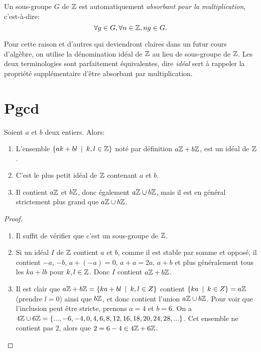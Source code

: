 \begin{proposition} Un sous-groupe $G$ de $\mathbb{Z}$ est automatiquement \emph{absorbant pour la multiplication}, c'est-à-dire:
\[ \forall g\in G, \forall n\in \mathbb{Z}, ng \in G.\]
\end{proposition}

Pour cette raison et d'autres qui deviendront claires dans un futur cours d'algèbre, on utilise la dénomination \og idéal de $\mathbb{Z}$\fg{} au lieu de \og sous-groupe de $\mathbb{Z}$\fg{}. Les deux terminologies sont parfaitement équivalentes, dire \emph{idéal} sert à rappeler la propriété supplémentaire d'être absorbant par multiplication.

\section{Pgcd}

\begin{proposition}
Soient $a$ et $b$ deux entiers. Alors:
\begin{enumerate}
\item L'ensemble $\{ak+bl\:\mid\: k, l\in \mathbb{Z}\}$ noté par définition $a\mathbb{Z}+b\mathbb{Z}$, est un idéal de $\mathbb{Z}$.
\item C'est le plus petit idéal de $\mathbb{Z}$ contenant $a$ et $b$. %
\item Il contient $a\mathbb{Z}$ et $b\mathbb{Z}$, donc également $a\mathbb{Z}\cup b\mathbb{Z}$, mais il est en général strictement plus grand que $a\mathbb{Z}\cup b\mathbb{Z}$.
\end{enumerate}
\end{proposition}
\begin{proof}
\begin{enumerate}
\item Il suffit de vérifier que c'est un sous-groupe de $\mathbb{Z}$.
\item Si un idéal $I$ de $\mathbb{Z}$ contient $a$ et $b$, comme il est stable par somme et opposé, il contient $-a$, $-b$, $a+(-a)=0$, $a+a=2a$, $a+b$ et plus généralement tous les $ka+lb$ pour $k,l\in\mathbb{Z}$. Donc $I$ contient $a\mathbb{Z}+b\mathbb{Z}$.
\item Il est clair que $a\mathbb{Z}+b\mathbb{Z}=\{ka+bl\:\mid\: k,l\in Z\}$ contient $\{ka\:\mid\: k\in Z\} = a\mathbb{Z}$ (prendre $l=0$) ainsi que $b\mathbb{Z}$, et donc contient l'union $a\mathbb{Z}\cup b\mathbb{Z}$. Pour voir que l'inclusion peut être stricte, prenons $a=4$ et $b=6$. On a $4\mathbb{Z}\cup 6\mathbb{Z} = \{ ..., -6,-4,0,4,6,8,12,16,18,20,24,28, ...\}$. Cet ensemble ne contient pas $2$, alors que $2=6-4\in 4\mathbb{Z}+6\mathbb{Z}$.
\end{enumerate}
\end{proof}


